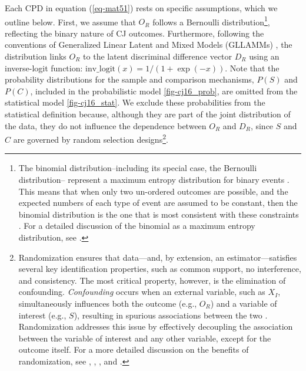 \documentclass[
  authoryear,
  review,
  1p]{elsarticle}
\begin{document}
Each CPD in equation (\ref{eq-mat51}) rests on specific assumptions,
which we outline below. First, we assume that \(O_{R}\) follows a
Bernoulli distribution\footnote{The binomial distribution--including its
  special case, the Bernoulli distribution-- represent a maximum entropy
  distribution for binary events \citep[pp.~34]{McElreath_2020}. This
  means that when only two un-ordered outcomes are possible, and the
  expected numbers of each type of event are assumed to be constant,
  then the binomial distribution is the one that is most consistent with
  these constraints \citep[pp.~310]{McElreath_2020}. For a detailed
  discussion of the binomial as a maximum entropy distribution, see
  \citet[chap.~10.1.2]{McElreath_2020}.}, reflecting the binary nature
of CJ outcomes. Furthermore, following the conventions of Generalized
Linear Latent and Mixed Models (GLLAMMs)
\citep{Rabe_et_al_2004a, Skrondal_et_al_2004a, Rabe_et_al_2012b}, the
distribution links \(O_{R}\) to the latent discriminal difference vector
\(D_{R}\) using an inverse-logit function:
\(\text{inv\_logit}(x) = 1/(1 + \exp(-x))\). Note that the probability
distributions for the sample and comparison mechanisms, \(P(S)\) and
\(P(C)\), included in the probabilistic model \ref{fig-cj16_prob}, are
omitted from the statistical model \ref{fig-cj16_stat}. We exclude these
probabilities from the statistical definition because, although they are
part of the joint distribution of the data, they do not influence the
dependence between \(O_{R}\) and \(D_{R}\), since \(S\) and \(C\) are
governed by random selection designs\footnote{Randomization ensures that
  data---and, by extension, an estimator---satisfies several key
  identification properties, such as common support, no interference,
  and consistency. The most critical property, however, is the
  elimination of confounding. \emph{Confounding} occurs when an external
  variable, such as \(X_{I}\), simultaneously influences both the
  outcome (e.g., \(O_{R}\)) and a variable of interest (e.g., \(S\)),
  resulting in spurious associations between the two
  \citep{Everitt_et_al_2010}. Randomization addresses this issue by
  effectively decoupling the association between the variable of
  interest and any other variable, except for the outcome itself. For a
  more detailed discussion on the benefits of randomization, see
  \citet{Pearl_2009}, \citet{Morgan_et_al_2014}, \citet{Neal_2020}, and
  \citet{Hernan_et_al_2020}.}.
\end{document}
